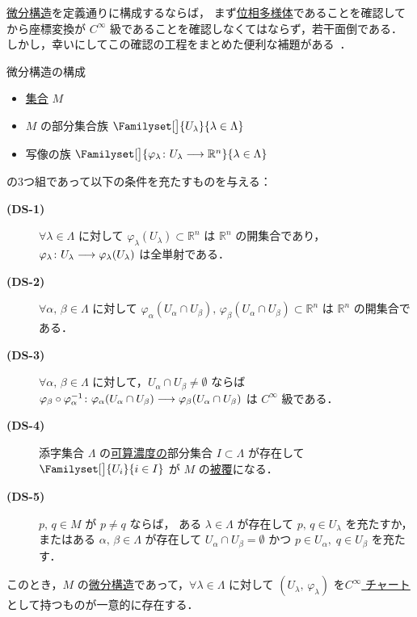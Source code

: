 \documentclass[geometry_main]{subfiles}
\begin{document}
\hyperref[maxatlas]{微分構造}を定義通りに構成するならば，
まず\hyperref[def.topomani]{位相多様体}であることを確認してから座標変換が $C^\infty$ 級であることを確認しなくてはならず，若干面倒である．
しかし，幸いにしてこの確認の工程をまとめた便利な補題がある~\cite[p.21, Lemma 1.35]{Lee12}．
\begin{mylem}[label=lem:cinfty-chart]{微分構造の構成}
	\begin{itemize}
		\item \underline{集合} $M$
		\item $M$ の部分集合族 $\Familyset[\big]{U_\lambda}{\lambda \in \Lambda}$
		\item 写像の族 $\Familyset[\big]{\varphi_\lambda \colon U_\lambda \lto \mathbb{R}^n}{\lambda \in \Lambda}$
	\end{itemize}
	の3つ組であって以下の条件を充たすものを与える：
	\begin{description}
		\item[\textbf{(DS-1)}]  $\forall \lambda \in \Lambda$ に対して 
		$\varphi_\lambda (U_\lambda) \subset \mathbb{R}^n$ は $\mathbb{R}^n$ の開集合であり，
		$\varphi_\lambda \colon U_\lambda \longrightarrow \varphi_\lambda (U_\lambda)$
		は全単射である．
		\item[\textbf{(DS-2)}]  $\forall \alpha,\, \beta \in \Lambda$ に対して $\varphi_\alpha (U_\alpha \cap U_\beta),\, \varphi_\beta (U_\alpha \cap U_\beta) \subset \mathbb{R}^n$ は $\mathbb{R}^n$ の開集合である．
		\item[\textbf{(DS-3)}]  $\forall \alpha,\, \beta \in \Lambda$ に対して，$U_\alpha \cap U_\beta \neq \emptyset$ ならば $\varphi_\beta \circ \varphi_\alpha^{-1} \colon \varphi_\alpha (U_\alpha \cap U_\beta) \longrightarrow \varphi_\beta (U_\alpha \cap U_\beta)$ は $C^\infty$ 級である．
		\item[\textbf{(DS-4)}]  添字集合 $\Lambda$ の\underline{可算濃度の}部分集合 $I \subset \Lambda$ が存在して
		$\Familyset[\big]{U_i}{i \in I}$ が $M$ の\hyperref[def:cover]{被覆}になる．
		\item[\textbf{(DS-5)}]  $p,\, q \in M$ が $p \neq q$ ならば，
		ある $\lambda \in \Lambda$ が存在して $p,\, q \in U_\lambda$ を充たすか，
		またはある $\alpha,\, \beta \in \Lambda$ が存在して $U_\alpha \cap U_\beta = \emptyset$ かつ $p \in U_\alpha,\; q \in U_\beta$ を充たす．
	\end{description}
	このとき，$M$ の\hyperref[maxatlas]{微分構造}であって，$\forall \lambda \in \Lambda$ に対して $(U_\lambda,\, \varphi_\lambda)$ を\hyperref[diffmani]{$C^\infty$ チャート}として持つものが一意的に存在する．
\end{mylem}
\end{document}
